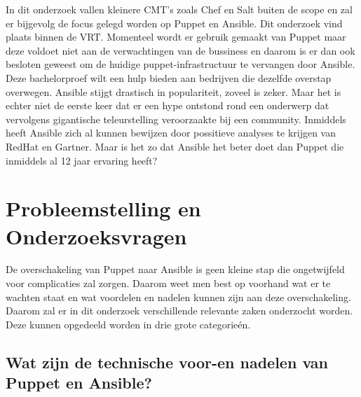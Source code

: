 In dit onderzoek vallen kleinere CMT's zoals Chef en Salt buiten de scope en zal er bijgevolg de focus gelegd worden op Puppet en Ansible. Dit onderzoek vind plaats binnen de VRT. Momenteel wordt er gebruik gemaakt van Puppet maar deze voldoet niet aan de verwachtingen van de bussiness en daarom is er dan ook besloten geweest om de huidige puppet-infrastructuur te vervangen door Ansible.
Deze bachelorproef wilt een hulp bieden aan bedrijven die dezelfde overstap overwegen. Ansible stijgt drastisch in populariteit, zoveel is zeker. Maar het is echter niet de eerste keer dat er een hype ontstond rond een onderwerp dat vervolgens gigantische teleurstelling veroorzaakte bij een community. Inmiddels heeft Ansible zich al kunnen bewijzen door possitieve analyses te krijgen van RedHat en Gartner. Maar is het zo dat Ansible het beter doet dan Puppet die inmiddels al 12 jaar ervaring heeft?




\section{Probleemstelling en Onderzoeksvragen}
\label{sec:onderzoeksvragen}




De overschakeling van Puppet naar Ansible is geen kleine stap die ongetwijfeld voor complicaties zal zorgen. Daarom weet men best op voorhand wat er te wachten staat en wat voordelen en nadelen kunnen zijn aan deze overschakeling. Daarom zal er in dit onderzoek verschillende relevante zaken onderzocht worden. Deze kunnen opgedeeld worden in drie grote categorie\'en. 
\subsection{Wat zijn de technische voor-en nadelen van Puppet en Ansible?}

